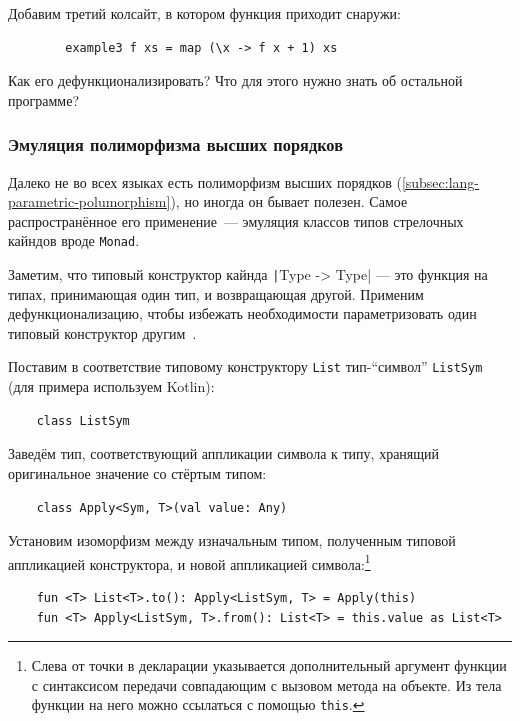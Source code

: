 \begin{task}
    Добавим третий колсайт, в котором функция приходит снаружи:
    \begin{verbatim}
        example3 f xs = map (\x -> f x + 1) xs
    \end{verbatim}
    Как его дефункционализировать?
    Что для этого нужно знать об остальной программе?
\end{task}

\subsubsection{Эмуляция полиморфизма высших порядков} \label{subsubsec:simulating-hkt}

Далеко не во всех языках есть полиморфизм высших порядков (\ref{subsec:lang-parametric-polumorphism}), но иногда он бывает полезен.
Самое распространённое его применение~--- эмуляция классов типов стрелочных кайндов вроде \texttt{Monad}.

Заметим, что типовый конструктор кайнда \texttt|Type -> Type| --- это функция на типах, принимающая один тип, и возвращающая другой.
Применим дефункционализацию, чтобы избежать необходимости параметризовать один типовый конструктор другим~\cite{defunctionalization-slides, yallop2014lightweight}.

Поставим в соответствие типовому конструктору \texttt{List} тип-``символ'' \texttt{ListSym} (для примера используем Kotlin):
\begin{verbatim}
    class ListSym
\end{verbatim}
Заведём тип, соответствующий аппликации символа к типу, хранящий оригинальное значение со стёртым типом:
\begin{verbatim}
    class Apply<Sym, T>(val value: Any)
\end{verbatim}
Установим изоморфизм между изначальным типом, полученным типовой аппликацией конструктора, и новой аппликацией символа:\footnote{Слева от точки в декларации указывается дополнительный аргумент функции с синтаксисом передачи совпадающим с вызовом метода на объекте. Из тела функции на него можно ссылаться с помощью \texttt{this}.}
\begin{verbatim}
    fun <T> List<T>.to(): Apply<ListSym, T> = Apply(this)
    fun <T> Apply<ListSym, T>.from(): List<T> = this.value as List<T>
\end{verbatim}

